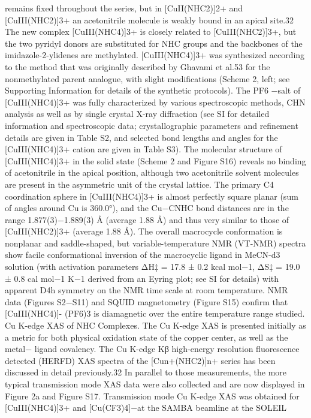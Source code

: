 \documentclass{article}
\begin{document}
remains ﬁxed throughout the series, but in [CuII(NHC2)]2+
and [CuIII(NHC2)]3+ an acetonitrile molecule is weakly bound
in an apical site.32 The new complex [CuIII(NHC4)]3+ is
closely related to [CuIII(NHC2)]3+, but the two pyridyl donors
are substituted for NHC groups and the backbones of the
imidazole-2-ylidenes are methylated. [CuIII(NHC4)]3+ was
synthesized according to the method that was originally
described by Ghavami et al.53 for the nonmethylated parent
analogue, with slight modiﬁcations (Scheme 2, left; see
Supporting Information for details of the synthetic protocols).
The PF6
−salt of [CuIII(NHC4)]3+ was fully characterized by
various spectroscopic methods, CHN analysis as well as by
single crystal X-ray diﬀraction (see SI for detailed information
and spectroscopic data; crystallographic parameters and
reﬁnement details are given in Table S2, and selected bond
lengths and angles for the [CuIII(NHC4)]3+ cation are given in
Table S3). The molecular structure of [CuIII(NHC4)]3+ in the
solid state (Scheme 2 and Figure S16) reveals no binding of
acetonitrile in the apical position, although two acetonitrile
solvent molecules are present in the asymmetric unit of the
crystal lattice. The primary C4 coordination sphere in
[CuIII(NHC4)]3+ is almost perfectly square planar (sum of
angles around Cu is 360.0°), and the Cu−CNHC bond
distances are in the range 1.877(3)−1.889(3) Å (average
1.88 Å) and thus very similar to those of [CuIII(NHC2)]3+
(average 1.88 Å). The overall macrocycle conformation is
nonplanar and saddle-shaped, but variable-temperature NMR
(VT-NMR) spectra show facile conformational inversion of
the macrocyclic ligand in MeCN-d3 solution (with activation
parameters ΔH‡ = 17.8 ± 0.2 kcal mol−1, ΔS‡ = 19.0 ± 0.8 cal
mol−1 K−1 derived from an Eyring plot; see SI for details) with
apparent D4h symmetry on the NMR time scale at room
temperature. NMR data (Figures S2−S11) and SQUID
magnetometry (Figure S15) conﬁrm that [CuIII(NHC4)]-
(PF6)3 is diamagnetic over the entire temperature range
studied.
Cu K-edge XAS of NHC Complexes. The Cu K-edge
XAS is presented initially as a metric for both physical
oxidation state of the copper center, as well as the metal−
ligand covalency. The Cu K-edge Kβ high-energy resolution
ﬂuorescence detected (HERFD) XAS spectra of the
[Cun+(NHC2)]n+ series has been discussed in detail
previously.32 In parallel to those measurements, the more
typical transmission mode XAS data were also collected and
are now displayed in Figure 2a and Figure S17. Transmission
mode Cu K-edge XAS was obtained for [CuIII(NHC4)]3+ and
[Cu(CF3)4]−at the SAMBA beamline at the SOLEIL
\end{document}
